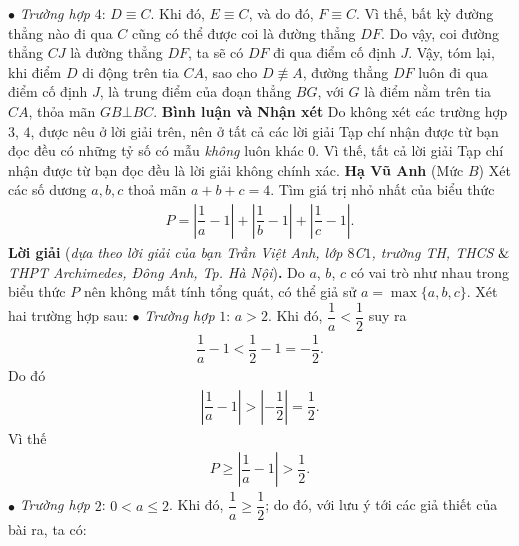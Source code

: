 \begin{multicols}{2}
\begin{figure}[H]
		\vspace*{-15pt}
	\end{figure}
	$\bullet$ \textit{Trường hợp} $4$: $D \equiv C$.
	\vskip 0.05cm
	Khi đó, $E \equiv C$, và do đó, $F \equiv C$. Vì thế, bất kỳ đường thẳng nào đi qua $C$ cũng có thể được coi là đường thẳng $DF$. Do vậy, coi đường thẳng $CJ$ là đường thẳng $DF$, ta sẽ có $DF$ đi qua điểm cố định $J$.
	\vskip 0.05cm
	Vậy, tóm lại, khi điểm $D$ di động trên tia $CA$, sao cho  $D \not\equiv A$, đường thẳng $DF$ luôn đi qua điểm cố định $J$, là trung điểm của đoạn thẳng $BG$, với $G$ là điểm nằm trên tia $CA$, thỏa mãn $GB \bot BC$.
	\vskip 0.05cm
	\textbf{\color{thachthuctoanhoc}Bình luận và Nhận xét}
	\vskip 0.05cm
	Do không xét các trường hợp $3$, $4$, được nêu ở lời giải trên, nên ở tất cả các lời giải Tạp chí nhận được từ bạn đọc đều có những tỷ số có mẫu \textit{không} luôn khác $0$. Vì thế, tất cả lời giải Tạp chí nhận được từ bạn đọc đều là lời giải không chính xác.
	\vskip 0.05cm
	\hfill	\textbf{\color{thachthuctoanhoc}Hạ Vũ Anh}
	\vskip 0.05cm
	{}
	(Mức $B$) Xét các số dương $a,b,c$ thoả mãn $a+b+c=4$. Tìm giá trị nhỏ nhất của biểu thức 
	\begin{align*}
		P=\left|\dfrac 1a-1\right|+\left|\dfrac 1b-1\right|+\left|\dfrac 1c-1\right|.
	\end{align*}
	\textbf{\color{thachthuctoanhoc}Lời giải} (\textit{dựa theo lời giải của bạn Trần Việt Anh, lớp $8$C$1$, trường TH, THCS $\color{black}\&$ THPT Archimedes, Đông Anh, Tp. Hà Nội})\textbf{\color{thachthuctoanhoc}.}
	\vskip 0.05cm
	Do $a$, $b$, $c$ có vai trò như nhau trong biểu thức $P$ nên không mất tính tổng quát, có thể giả sử $a = \max\{a, b, c\}$.
	\vskip 0.05cm
	Xét hai trường hợp sau:
	\vskip 0.05cm
	$\bullet$ \textit{Trường hợp} $1$: $a > 2$.
	\vskip 0.05cm
	Khi đó, $\dfrac{1}{a} < \dfrac{1}{2}$  suy ra
	\begin{align*}
		\dfrac{1}{a} - 1 < \dfrac{1}{2} - 1 =  - \dfrac{1}{2}.
	\end{align*}
	Do đó
	\begin{align*}
		\left| {\dfrac{1}{a} - 1} \right| > \left| { - \dfrac{1}{2}} \right| = \dfrac{1}{2}.
	\end{align*}
	Vì thế
	\begin{align*}
		P \ge \left| {\dfrac{1}{a} - 1} \right| > \dfrac{1}{2}.
	\end{align*}
	$\bullet$ \textit{Trường hợp} $2$: $0 < a \le 2$.
	\vskip 0.05cm
	Khi đó, $\dfrac{1}{a} \ge \dfrac{1}{2}$; do đó, với lưu ý tới các giả thiết của bài ra, ta có:

\end{multicols}
